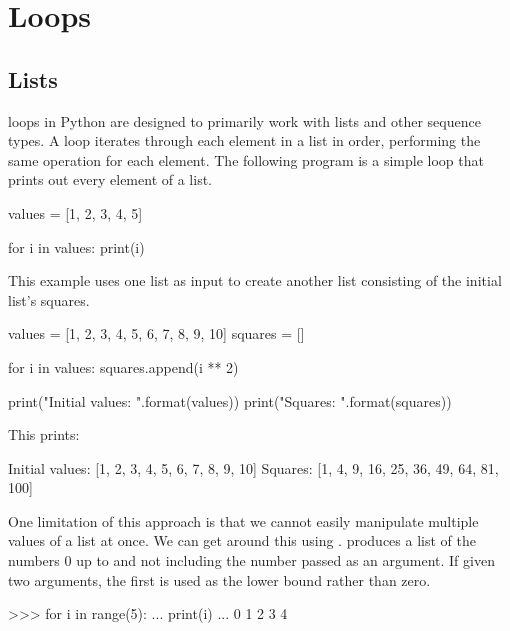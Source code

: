 \documentclass[11pt]{cselabheader}
\begin{document}
\pagebreak
\section{\protect{} Loops}

\subsection{Lists}
 loops in Python are designed to primarily work with lists and
other sequence types. A  loop iterates through each element in
a list in order, performing the same operation for each element. The following
program is a simple  loop that prints out every element of a
list.

\begin{python3code}
values = [1, 2, 3, 4, 5]

for i in values:
    print(i)
\end{python3code}

This example uses one list as input to create another list consisting of the
initial list's squares.

\begin{python3code}
values = [1, 2, 3, 4, 5, 6, 7, 8, 9, 10]
squares = []

for i in values:
    squares.append(i ** 2)

print("Initial values: {}".format(values))
print("Squares: {}".format(squares))
\end{python3code}

This prints:

\begin{verbatimcode}
Initial values: [1, 2, 3, 4, 5, 6, 7, 8, 9, 10]
Squares: [1, 4, 9, 16, 25, 36, 49, 64, 81, 100]
\end{verbatimcode}

One limitation of this approach is that we cannot easily manipulate multiple
values of a list at once. We can get around this using .
 produces a list of the numbers 0 up to and not including the
number passed as an argument. If given two arguments, the first is used as the
lower bound rather than zero.

\begin{pyconcode}
>>> for i in range(5):
...   print(i)
... 
0
1
2
3
4
\end{pyconcode}
\end{document}
